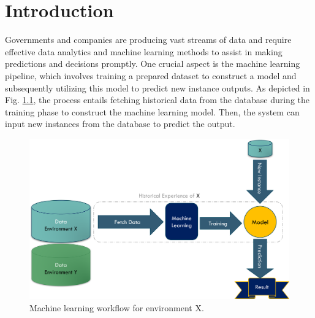 
\chapter{Introduction}
\label{cha:1_Introduction}

\ifpdf
    \graphicspath{{1_introduction/figures/PNG/}{1_introduction/figures/PDF/}{1_introduction/figures/}}
\else
    \graphicspath{{1_introduction/figures/EPS/}{1_introduction/figures/}}
\fi



Governments and companies are producing vast streams of data and require effective data analytics and machine learning methods to assist in making predictions and decisions promptly. One crucial aspect is the machine learning pipeline, which involves training a prepared dataset to construct a model and subsequently utilizing this model to predict new instance outputs. As depicted in Fig. \ref{fig:machine-old-senario}, the process entails fetching historical data from the database during the training phase to construct the machine learning model. Then, the system can input new instances from the database to predict the output.

\begin{figure}[!ht]
    \centering
    \includegraphics[width=.9\textwidth]{1_introduction/figures/PNG/machine_flow.png}
    \caption{Machine learning workflow for environment X.}
    \label{fig:machine-old-senario}
\end{figure}

